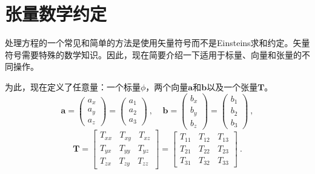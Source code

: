 \documentclass[MathematicsNumericsDerivationsAndOpenFOAM.tex]{subfiles}
\begin{document}
\section{张量数学约定}
%
%
	处理方程的一个常见和简单的方法是使用矢量符号而不是Einsteins求和约定。矢量符号需要特殊的数学知识。因此，现在简要介绍一下适用于标量、向量和张量的不同操作。

	为此，现在定义了任意量：一个标量$\phi$，两个向量$\textbf{a}$和$\textbf{b}$以及一个张量$\textbf{T}$。
%
%
\begin{equation*}
  \textbf{a}
=
  \left(
  \begin{matrix}
    a_x \\ a_y \\ a_z
  \end{matrix}
  \right)
=
  \left(
  \begin{matrix}
    a_1 \\ a_2 \\ a_3
  \end{matrix}
  \right)
  ~,~~~~~
  \textbf{b}
=
  \left(
  \begin{matrix}
    b_x \\ b_y \\ b_z
  \end{matrix}
  \right)
=
  \left(
  \begin{matrix}
    b_1 \\ b_2 \\ b_3
  \end{matrix}
  \right)
  ~,
\end{equation*}
%
%
\begin{equation*}
  \textbf{T}
=
  \left[
  \begin{matrix}
   T_{xx} ~ ~ ~ ~ T_{xy} ~ ~ ~ ~ T_{xz} \\
   T_{yx} ~ ~ ~ ~ T_{yy} ~ ~ ~ ~ T_{yz} \\
   T_{zx} ~ ~ ~ ~ T_{zy} ~ ~ ~ ~ T_{zz}
  \end{matrix}
  \right]
=
  \left[
  \begin{matrix}
   T_{11} ~ ~ ~ ~ T_{12} ~ ~ ~ ~ T_{13} \\
   T_{21} ~ ~ ~ ~ T_{22} ~ ~ ~ ~ T_{23} \\
   T_{31} ~ ~ ~ ~ T_{32} ~ ~ ~ ~ T_{33}
  \end{matrix}
  \right] ~.
\end{equation*}
%
%
\end{document}
